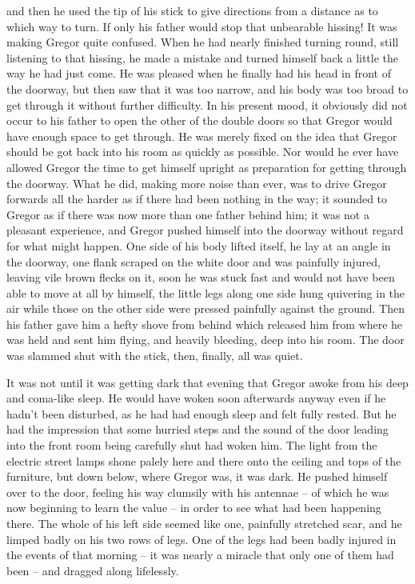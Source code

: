 and then he used the tip of his stick to give directions from a
distance as to which way to turn. If only his father would stop that
unbearable hissing! It was making Gregor quite confused. When he had
nearly finished turning round, still listening to that hissing, he made
a mistake and turned himself back a little the way he had just come. He
was pleased when he finally had his head in front of the doorway, but
then saw that it was too narrow, and his body was too broad to get
through it without further difficulty. In his present mood, it
obviously did not occur to his father to open the other of the double
doors so that Gregor would have enough space to get through. He was
merely fixed on the idea that Gregor should be got back into his room
as quickly as possible. Nor would he ever have allowed Gregor the time
to get himself upright as preparation for getting through the doorway.
What he did, making more noise than ever, was to drive Gregor forwards
all the harder as if there had been nothing in the way; it sounded to
Gregor as if there was now more than one father behind him; it was not
a pleasant experience, and Gregor pushed himself into the doorway
without regard for what might happen. One side of his body lifted
itself, he lay at an angle in the doorway, one flank scraped on the
white door and was painfully injured, leaving vile brown flecks on it,
soon he was stuck fast and would not have been able to move at all by
himself, the little legs along one side hung quivering in the air while
those on the other side were pressed painfully against the ground. Then
his father gave him a hefty shove from behind which released him from
where he was held and sent him flying, and heavily bleeding, deep into
his room. The door was slammed shut with the stick, then, finally, all
was quiet.

\endchapter


It was not until it was getting dark that evening that Gregor awoke
from his deep and coma-like sleep. He would have woken soon afterwards
anyway even if he hadn’t been disturbed, as he had had enough sleep and
felt fully rested. But he had the impression that some hurried steps
and the sound of the door leading into the front room being carefully
shut had woken him. The light from the electric street lamps shone
palely here and there onto the ceiling and tops of the furniture, but
down below, where Gregor was, it was dark. He pushed himself over to
the door, feeling his way clumsily with his antennae – of which he was
now beginning to learn the value – in order to see what had been
happening there. The whole of his left side seemed like one, painfully
stretched scar, and he limped badly on his two rows of legs. One of the
legs had been badly injured in the events of that morning – it was nearly
a miracle that only one of them had been – and dragged along lifelessly.

